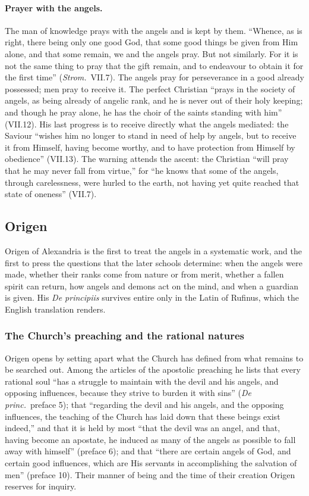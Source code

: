 \paragraph{Prayer with the angels.} The man of knowledge prays with the
angels and is kept by them. ``Whence, as is right, there being only one
good God, that some good things be given from Him alone, and that some
remain, we and the angels pray. But not similarly. For it is not the same
thing to pray that the gift remain, and to endeavour to obtain it for the
first time'' (\emph{Strom.}\ VII.7). The angels pray for perseverance in a
good already possessed; men pray to receive it. The perfect Christian
``prays in the society of angels, as being already of angelic rank, and he
is never out of their holy keeping; and though he pray alone, he has the
choir of the saints standing with him'' (VII.12). His last progress is to
receive directly what the angels mediated: the Saviour ``wishes him no
longer to stand in need of help by angels, but to receive it from Himself,
having become worthy, and to have protection from Himself by obedience''
(VII.13). The warning attends the ascent: the Christian ``will pray that he
may never fall from virtue,'' for ``he knows that some of the angels,
through carelessness, were hurled to the earth, not having yet quite
reached that state of oneness'' (VII.7).

\sectionguard
\subsection{Origen}\label{sec:fb-origen}

Origen of Alexandria is the first to treat the angels in a systematic
work, and the first to press the questions that the later schools
determine: when the angels were made, whether their ranks come from
nature or from merit, whether a fallen spirit can return, how angels and
demons act on the mind, and when a guardian is given. His \emph{De
principiis} survives entire only in the Latin of Rufinus, which the
English translation renders.

\subsubsection{The Church's preaching and the rational natures}

Origen opens by setting apart what the Church has defined from what
remains to be searched out. Among the articles of the apostolic preaching
he lists that every rational soul ``has a struggle to maintain with the
devil and his angels, and opposing influences, because they strive to
burden it with sins'' (\emph{De princ.}\ preface 5); that ``regarding the
devil and his angels, and the opposing influences, the teaching of the
Church has laid down that these beings exist indeed,'' and that it is held
by most ``that the devil was an angel, and that, having become an apostate,
he induced as many of the angels as possible to fall away with himself''
(preface 6); and that ``there are certain angels of God, and certain good
influences, which are His servants in accomplishing the salvation of men''
(preface 10). Their manner of being and the time of their creation Origen
reserves for inquiry.

